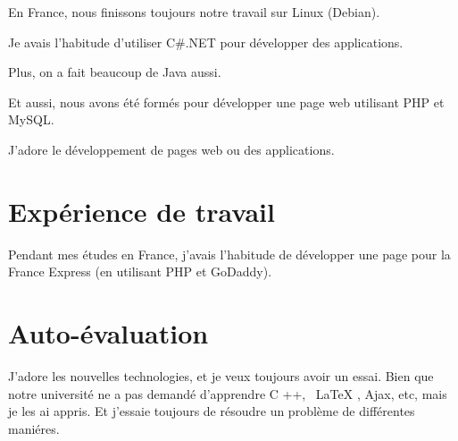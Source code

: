 \documentclass[UTF8]{ctexart}
\begin{document}
En France, nous finissons toujours notre travail sur Linux (Debian).

Je avais l'habitude d'utiliser C\#{}.NET pour d\'evelopper des applications.

Plus, on a fait beaucoup de Java aussi.

Et aussi, nous avons \'et\'e form\'es pour d\'evelopper une page web utilisant PHP et MySQL.

J'adore le d\'eveloppement de pages web ou des applications.
\section{Exp\'erience de travail}
Pendant mes \'etudes en France, j'avais l'habitude de d\'evelopper une page pour la France Express (en utilisant PHP et GoDaddy).
\section{Auto-\'evaluation}
J'adore les nouvelles technologies, et je veux toujours avoir un essai. Bien que notre universit\'e ne a pas demand\'e d'apprendre C ++, \ LaTeX {}, Ajax, etc, mais je les ai appris. Et j'essaie toujours de r\'esoudre un probl\`eme de diff\'erentes mani\'eres.
\end{document}
